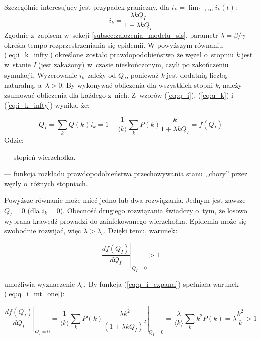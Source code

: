 Szczególnie interesujący jest przypadek graniczny, dla $\displaystyle i_k =  \lim_{t\to\infty} i_k(t)$:
\begin{equation}
\label{eq:i_k_infty}
i_k = \frac{\lambda k Q_I}{1+\lambda k Q_I}
\end{equation}
Zgodnie z~zapisem w~sekcji \ref{subsec:zalozenia_modelu_sis}, parametr $\lambda = \beta / \gamma $ określa tempo rozprzestrzeniania się epidemii.
W powyższym równaniu (\ref{eq:i_k_infty}) określone zostało prawdopodobieństwo że węzeł o~stopniu \emph{k} jest w~stanie \emph{I} (jest zakażony) w~czasie nieskończonym, czyli po zakończeniu symulacji. Wyzerowanie $i_k$ zależy od $Q_I$, ponieważ \emph{k} jest dodatnią liczbą naturalną, a~$\lambda > 0$.
By wykonywać obliczenia dla wszystkich stopni \emph{k}, należy zsumować obliczenia dla każdego z~nich. Z~wzorów (\ref{eq:q_i}), (\ref{eq:q_k}) i~ (\ref{eq:i_k_infty}) wynika, że:

\begin{equation}
\label{eq:q_i_expand}
Q_I = \sum_{k}Q(k)i_k = 1 - \frac{1}{\langle k \rangle}\sum_{k}P(k)\frac{k}{1+\lambda k Q_I} = f(Q_I)
\end{equation}
Gdzie:
\begin{description} \itemsep0pt
\item[k] --- stopień wierzchołka.
\item[$\pmb{f(Q_I)}$] --- funkcja rozkładu prawdopodobieństwa przechowywania stanu ,,chory'' przez węzły o~różnych stopniach.
\end{description}
Powyższe równanie może mieć jedno lub dwa rozwiązania. Jednym jest zawsze $Q_I = 0$ (dla $i_k = 0$). Obecność drugiego rozwiązania świadczy o~tym, że losowo wybrana krawędź prowadzi do zainfekowanego wierzchołka. Epidemia może się swobodnie rozwijać, więc $\lambda > \lambda_c$. Dzięki temu, warunek:

\begin{equation}
\label{eq:q_i_mt_one}
\left.\frac{df(Q_I)}{dQ_I}\right|_{Q_I=0} > 1
\end{equation}

umożliwia wyznaczenie $\lambda_c$. By funkcja (\ref{eq:q_i_expand}) spełniała warunek (\ref{eq:q_i_mt_one}):

\begin{equation}
\label{eq:q_i_mt_one_q_i}
\left.\frac{df(Q_I)}{dQ_I}\right|_{Q_I=0} = \left.\frac{1}{\langle k \rangle}\sum_{k}P(k)\frac{\lambda k^2}{(1+\lambda k Q_I)^2}\right|_{Q_I=0} = \frac{\lambda}{\langle k \rangle}\sum_{k}k^2P(k) = \lambda\frac{k^2}{k} > 1 
\end{equation}

